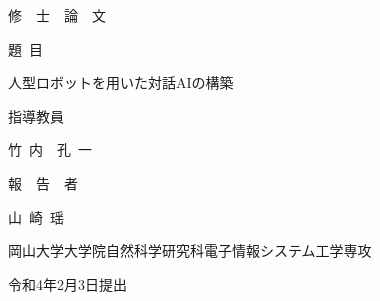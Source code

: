 \pagestyle{empty}

\begin{titlepage}

\vspace*{1cm}

\begin{center}


修\ \ 士\ \ 論\ \ 文

\vspace*{0.8cm}

題\ 目

\vspace*{1cm}

{\large{人型ロボットを用いた対話AIの構築}}


\vspace*{-0.3cm}

\underline{\hspace*{12cm}}

\vspace*{3cm}

指導教員

\vspace*{0.3cm}

{\large{竹~内~~孔~一}}

\vspace*{-0.3cm}

\underline{\hspace*{4cm}}

\vspace*{3cm}

報~~告~~者

\vspace*{0.3cm}

{\large{山~崎~瑶}}

\vspace*{-0.3cm}

\underline{\hspace*{4cm}}

\vspace*{0.5cm}

岡山大学大学院自然科学研究科電子情報システム工学専攻

\vspace*{2cm}

令和4年2月3日提出





\end{center}
\end{titlepage}
\newpage
